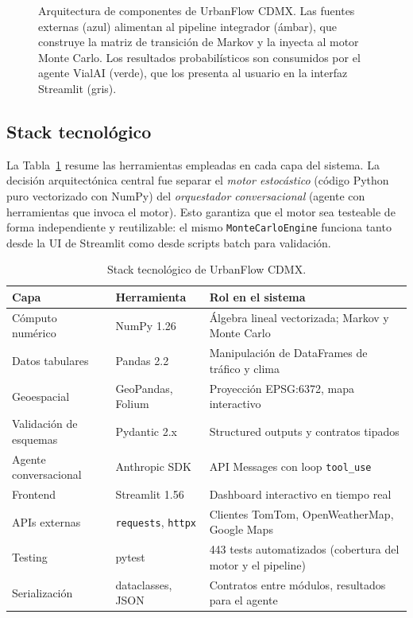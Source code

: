 \documentclass[11pt,a4paper]{article}
\begin{document}
\begin{figure}[H]
\begin{tikzpicture}
\end{tikzpicture}
\caption{Arquitectura de componentes de UrbanFlow CDMX. Las fuentes externas (azul) alimentan al pipeline integrador (ámbar), que construye la matriz de transición de Markov y la inyecta al motor Monte Carlo. Los resultados probabilísticos son consumidos por el agente VialAI (verde), que los presenta al usuario en la interfaz Streamlit (gris).}
\label{fig:arquitectura}
\end{figure}

\subsection{Stack tecnológico}

La Tabla~\ref{tab:stack} resume las herramientas empleadas en cada capa del sistema. La decisión arquitectónica central fue separar el \textit{motor estocástico} (código Python puro vectorizado con NumPy) del \textit{orquestador conversacional} (agente con herramientas que invoca el motor). Esto garantiza que el motor sea testeable de forma independiente y reutilizable: el mismo \texttt{MonteCarloEngine} funciona tanto desde la UI de Streamlit como desde scripts batch para validación.

\begin{table}[H]
\centering
\small
\begin{tabular}{@{}lll@{}}
\toprule
\textbf{Capa} & \textbf{Herramienta} & \textbf{Rol en el sistema} \\
\midrule
Cómputo numérico & NumPy 1.26 & Álgebra lineal vectorizada; Markov y Monte Carlo \\
Datos tabulares & Pandas 2.2 & Manipulación de DataFrames de tráfico y clima \\
Geoespacial & GeoPandas, Folium & Proyección EPSG:6372, mapa interactivo \\
Validación de esquemas & Pydantic 2.x & Structured outputs y contratos tipados \\
Agente conversacional & Anthropic SDK & API Messages con loop \texttt{tool\_use} \\
Frontend & Streamlit 1.56 & Dashboard interactivo en tiempo real \\
APIs externas & \texttt{requests}, \texttt{httpx} & Clientes TomTom, OpenWeatherMap, Google Maps \\
Testing & pytest & 443 tests automatizados (cobertura del motor y el pipeline) \\
Serialización & dataclasses, JSON & Contratos entre módulos, resultados para el agente \\
\bottomrule
\end{tabular}
\caption{Stack tecnológico de UrbanFlow CDMX.}
\label{tab:stack}
\end{table}
\end{document}
